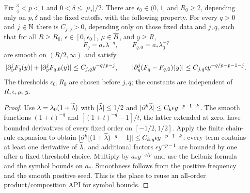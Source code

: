\begin{lemma}
  \label{lem:c04_reciprocal_amplitude_difference}
  Fix $\frac34<p<1$ and $0<\delta\le|\mu_*|/2$.
  There are $\epsilon_0\in(0,1]$ and $R_0\ge2$, depending only on $p,\delta$ and
  the fixed cutoffs, with the following property. For every $q>0$ and $j\in\mathbb{N}$
  there is $C_{j,q}>0$, depending only on those fixed data and $j,q$, such that
  for all $R\ge R_0$, $\epsilon\in[0,\epsilon_0]$, $\mu\in\overline{B}$, and $y\ge R$,
  \[
    F_q=a_*\lambda^{-q},\qquad F_{q,0}=a_*\lambda_0^{-q}
  \]
  are smooth on $(R/2,\infty)$ and satisfy
  \[
    |\partial_y^jF_q(y)|+|\partial_y^jF_{q,0}(y)|\le C_{j,q}y^{-q/p-j},\qquad
    |\partial_y^j(F_q-F_{q,0})(y)|\le C_{j,q}\epsilon y^{-q/p-p-1-j}.
  \]
  The thresholds $\epsilon_0,R_0$ are chosen before $j,q$; the constants are independent
  of $R,\epsilon,\mu,y$.
\end{lemma}
\begin{proof}
  Use $\lambda=\lambda_0(1+\widetilde{\lambda})$ with $|\widetilde{\lambda}|\le1/2$ and
  $|\partial^k\widetilde{\lambda}|\le C_k\epsilon y^{-p-1-k}$.
  The smooth functions $(1+t)^{-q}$ and $[(1+t)^{-q}-1]/t$, the latter extended at zero,
  have bounded derivatives of every fixed order on $[-1/2,1/2]$.
  Apply the finite chain-rule expansion to obtain
  $|\partial^k[(1+\widetilde{\lambda})^{-q}-1]|\le C_{k,q}\epsilon y^{-p-1-k}$:
  every term contains at least one derivative of $\widetilde{\lambda}$, and additional factors
  $\epsilon y^{-p-1}$ are bounded by one after a fixed threshold choice.
  Multiply by $a_*y^{-q/p}$ and use the Leibniz formula and the symbol bounds on $a_*$.
  Smoothness follows from the positive frequency and the smooth positive seed.
  This is the place to reuse an all-order product/composition API for symbol bounds.
\end{proof}

